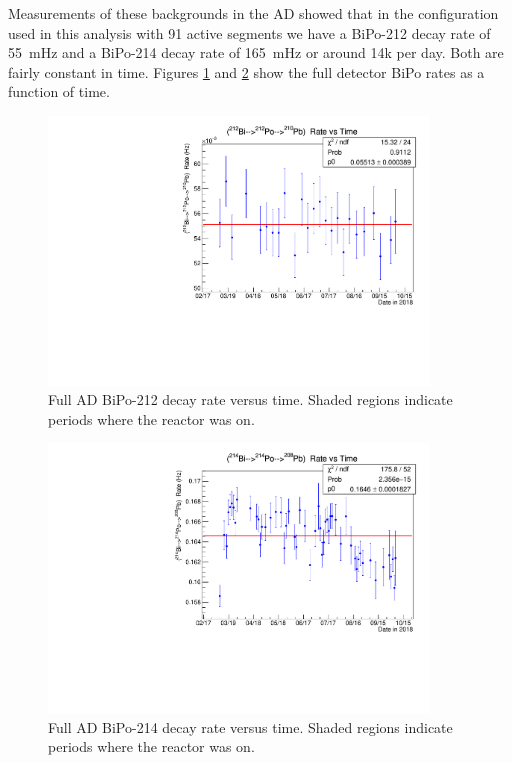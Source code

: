 Measurements of these backgrounds in the AD showed that in the configuration used in this analysis with 91 active segments we have a BiPo-212 decay rate of 55~mHz and a BiPo-214 decay rate of 165~mHz or around 14k per day. Both are fairly constant in time. Figures \ref{fig:BiPo212RatevsT} and \ref{fig:BiPo214RatevsT} show the full detector BiPo rates as a function of time.

\begin{figure}[!h]
\centering
\includegraphics[width=0.9\textwidth]{figures/BiPo212RatevsT.pdf}
\caption{\label{fig:BiPo212RatevsT}Full AD BiPo-212 decay rate versus time. Shaded regions indicate periods where the reactor was on.}
\end{figure}

\begin{figure}[!h]
\centering
\includegraphics[width=0.9\textwidth]{figures/BiPo214RatevsT.pdf}
\caption{\label{fig:BiPo214RatevsT}Full AD BiPo-214 decay rate versus time. Shaded regions indicate periods where the reactor was on.}
\end{figure}

